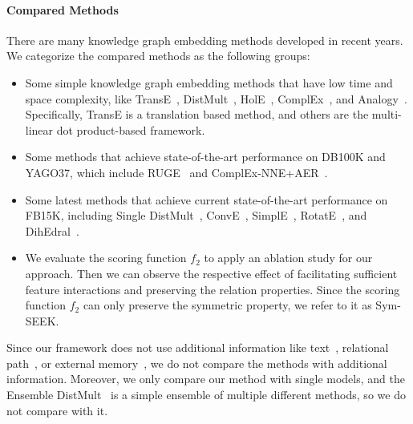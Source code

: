 \documentclass[11pt,a4paper]{article}
\begin{document}
\paragraph*{Compared Methods}
There are many knowledge graph embedding methods developed in recent years. We categorize the compared methods as the following groups:
\begin{itemize}[label={-},leftmargin=1.5em]
	\item Some simple knowledge graph embedding methods that have low time and space complexity, like TransE~\cite{bordes2013translating}, DistMult~\cite{yang2015embedding}, HolE~\cite{nickel2016holographic}, ComplEx~\cite{trouillon2016complex}, and Analogy~\cite{liu2017analogical}. Specifically, TransE is a translation based method, and others are the multi-linear dot product-based framework.
	
	\item Some methods that achieve state-of-the-art performance on DB100K and YAGO37, which include RUGE~\cite{guo2018:RUGE} and ComplEx-NNE+AER~\cite{boyang2018:aer}.
	
	\item Some latest methods that achieve current state-of-the-art performance on FB15K, including Single DistMult~\cite{kadlec2017knowledge}, ConvE~\cite{dettmers2018conve}, SimplE~\cite{kazemi2018simple}, RotatE~\cite{sun2018rotate}, and DihEdral~\cite{DBLP:conf/acl/XuL19}. 
	
	\item We evaluate the scoring function $f_2$ to apply an ablation study for our approach. Then we can observe the respective effect of facilitating sufficient feature interactions and preserving the relation properties. Since the scoring function $f_2$ can only preserve the symmetric property, we refer to it as Sym-SEEK.
\end{itemize}
Since our framework does not use additional information like text~\cite{toutanova2015observed}, relational path~\cite{ebisu2019graph}, or external memory~\cite{shen2017modeling}, we do not compare the methods with additional information. Moreover, we only compare our method with single models, and the Ensemble DistMult~\cite{kadlec2017knowledge} is a simple ensemble of multiple different methods, so we do not compare with it.
\end{document}
